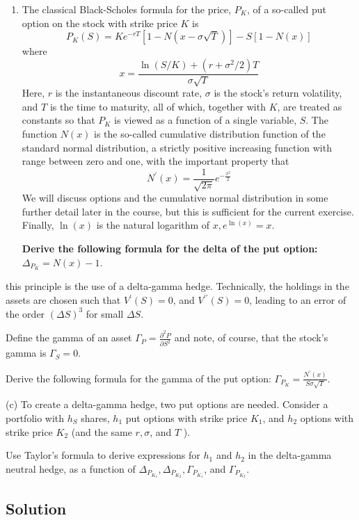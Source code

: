 \documentclass{article}
\begin{document}
\begin{enumerate}
\item[(a)] The classical Black-Scholes formula for the price, $P_{K}$, of a so-called put option on the stock with strike price $K$ is
\[
P_{K}(S)=K e^{-r T}[1-N(x-\sigma \sqrt{T})]-S[1-N(x)]
\]
where
\[
x=\frac{\ln (S / K)+\left(r+\sigma^{2} / 2\right) T}{\sigma \sqrt{T}}
\]
Here, $r$ is the instantaneous discount rate, $\sigma$ is the stock's return volatility, and $T$ is the time to maturity, all of which, together with $K$, are treated as constants so that $P_{K}$ is viewed as a function of a single variable, $S$. The function $N(x)$ is the so-called cumulative distribution function of the standard normal distribution, a strictly positive increasing function with range between zero and one, with the important property that
\[
N^{\prime}(x)=\frac{1}{\sqrt{2 \pi}} e^{-\frac{x^{2}}{2}}
\]
We will discuss options and the cumulative normal distribution in some further detail later in the course, but this is sufficient for the current exercise. Finally, $\ln (x)$ is the natural logarithm of $x, e^{\ln (x)}=x$.

\textbf{Derive the following formula for the delta of the put option:} $\Delta_{P_{K}}=N(x)-1$.
\end{enumerate}
this principle is the use of a delta-gamma hedge. Technically, the holdings in the assets are chosen such that $V^{\prime}(S)=0$, and $V^{\prime \prime}(S)=0$, leading to an error of the order $(\Delta S)^{3}$ for small $\Delta S$.

Define the gamma of an asset $\Gamma_{P}=\frac{\partial^{2} P}{\partial S^{2}}$ and note, of course, that the stock's gamma is $\Gamma_{S}=0$.

Derive the following formula for the gamma of the put option: $\Gamma_{P_{K}}=\frac{N^{\prime}(x)}{S \sigma \sqrt{T}}$.

(c) To create a delta-gamma hedge, two put options are needed. Consider a portfolio with $h_{S}$ shares, $h_{1}$ put options with strike price $K_{1}$, and $h_{2}$ options with strike price $K_{2}$ (and the same $r, \sigma$, and $T$ ).

Use Taylor's formula to derive expressions for $h_{1}$ and $h_{2}$ in the delta-gamma neutral hedge, as a function of $\Delta_{P_{K_{1}}}, \Delta_{P_{K_{2}}}, \Gamma_{P_{K_{1}}}$, and $\Gamma_{P_{K_{2}}}$.
\bigskip

\subsection*{Solution}
\end{document}
